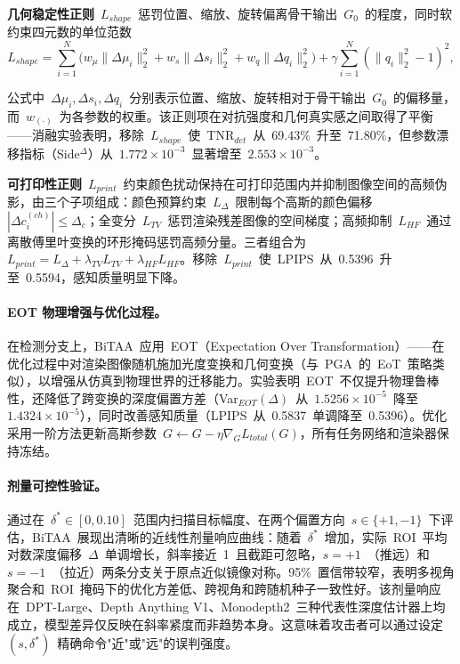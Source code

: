 \textbf{几何稳定性正则}~$L_{shape}$~惩罚位置、缩放、旋转偏离骨干输出~$G_0$~的程度，同时软约束四元数的单位范数
\begin{equation}
    L_{shape} = \sum_{i=1}^{N} \bigl( w_\mu \|\Delta\mu_i\|_2^2 + w_s \|\Delta s_i\|_2^2 + w_q \|\Delta q_i\|_2^2 \bigr) + \gamma \sum_{i=1}^{N} (\|q_i\|_2^2 - 1)^2,
\end{equation}

公式中~$\Delta\mu_i, \Delta s_i, \Delta q_i$~分别表示位置、缩放、旋转相对于骨干输出~$G_0$~的偏移量，而~$w_{(\cdot)}$~为各参数的权重。该正则项在对抗强度和几何真实感之间取得了平衡——消融实验表明，移除~$L_{shape}$~使~TNR$_{det}$~从~69.43\%~升至~71.80\%，但参数漂移指标（Side$^\Delta$）从~$1.772 \times 10^{-3}$~显著增至~$2.553 \times 10^{-3}$。

\textbf{可打印性正则}~$L_{print}$~约束颜色扰动保持在可打印范围内并抑制图像空间的高频伪影，由三个子项组成：颜色预算约束~$L_\Delta$~限制每个高斯的颜色偏移~$|\Delta c_i^{(ch)}| \leq \Delta_c$；全变分~$L_{TV}$~惩罚渲染残差图像的空间梯度；高频抑制~$L_{HF}$~通过离散傅里叶变换的环形掩码惩罚高频分量。三者组合为~$L_{print} = L_\Delta + \lambda_{TV} L_{TV} + \lambda_{HF} L_{HF}$。移除~$L_{print}$~使~LPIPS~从~0.5396~升至~0.5594，感知质量明显下降。

\paragraph{EOT 物理增强与优化过程。}
在检测分支上，BiTAA~应用~EOT（Expectation Over Transformation）——在优化过程中对渲染图像随机施加光度变换和几何变换（与~PGA~的~EoT~策略类似），以增强从仿真到物理世界的迁移能力。实验表明~EOT~不仅提升物理鲁棒性，还降低了跨变换的深度偏置方差（Var$_{EOT}(\Delta)$~从~$1.5256 \times 10^{-5}$~降至~$1.4324 \times 10^{-5}$），同时改善感知质量（LPIPS~从~0.5837~单调降至~0.5396）。优化采用一阶方法更新高斯参数~$G \leftarrow G - \eta \nabla_G L_{total}(G)$，所有任务网络和渲染器保持冻结。

\paragraph{剂量可控性验证。}
通过在~$\delta^* \in [0, 0.10]$~范围内扫描目标幅度、在两个偏置方向~$s \in \{+1, -1\}$~下评估，BiTAA~展现出清晰的近线性剂量响应曲线：随着~$\delta^*$~增加，实际~ROI~平均对数深度偏移~$\Delta$~单调增长，斜率接近~1~且截距可忽略，$s = +1$~（推远）和~$s = -1$~（拉近）两条分支关于原点近似镜像对称。95\%~置信带较窄，表明多视角聚合和~ROI~掩码下的优化方差低、跨视角和跨随机种子一致性好。该剂量响应在~DPT-Large、Depth Anything V1、Monodepth2~三种代表性深度估计器上均成立，模型差异仅反映在斜率紧度而非趋势本身。这意味着攻击者可以通过设定~$(s, \delta^*)$~精确命令"近"或"远"的误判强度。

